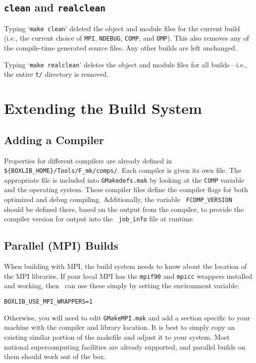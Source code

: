 \subsection{{\tt clean} and {\tt realclean}}

Typing `{\tt make clean}' deleted the object and module files for the
current build (i.e., the current choice of {\tt MPI}, {\tt NDEBUG},
{\tt COMP}, and {\tt OMP}).  This also removes any of the compile-time
generated source files.  Any other builds are left unchanged.

Typing `{\tt make realclean}' deletes the object and module files for
all builds---i.e., the entire {\tt t/} directory is removed.

\section{Extending the Build System}

\subsection{Adding a Compiler}

Properties for different compilers are already defined in 
{\tt \$\{BOXLIB\_HOME\}/Tools/F\_mk/comps/}.
Each compiler is given its own file.  The appropriate file is included
into {\tt GMakedefs.mak} by looking at the {\tt COMP} variable and the
operating system.  These compiler files define the compiler flags for
both optimized and debug compiling.  Additionally, the variable {\tt
FCOMP\_VERSION} should be defined there, based on the output from the
compiler, to provide the compiler version for output into the {\tt
job\_info} file at runtime.


\subsection{Parallel (MPI) Builds}

When building with MPI, the build system needs to know about the location of the
MPI libraries.  If your local MPI has the {\tt mpif90} and {\tt mpicc} wrappers
installed and working, then \maestro\ can use these simply by setting the
environment variable:
\begin{verbatim}
BOXLIB_USE_MPI_WRAPPERS=1
\end{verbatim}
Otherwise, you will need to edit {\tt GMakeMPI.mak} and add a section
specific to your machine with the compiler and library location.  It
is best to simply copy an existing similar portion of the makefile and
adjust it to your system.  Most national supercomputing facilities are
already supported, and parallel builds on them should work out of the
box.



